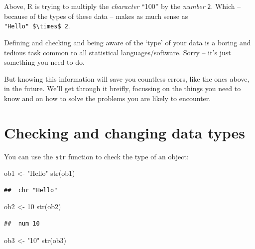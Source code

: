 \documentclass[
]{book}
\newenvironment{Shaded}{\begin{snugshade}}{\end{snugshade}}
\newcommand{\DecValTok}[1]{\textcolor[rgb]{0.00,0.00,0.81}{#1}}
\newcommand{\FunctionTok}[1]{\textcolor[rgb]{0.00,0.00,0.00}{#1}}
\newcommand{\NormalTok}[1]{#1}
\newcommand{\OtherTok}[1]{\textcolor[rgb]{0.56,0.35,0.01}{#1}}
\newcommand{\StringTok}[1]{\textcolor[rgb]{0.31,0.60,0.02}{#1}}
\begin{document}
Above, R is trying to multiply the \emph{character} ``100'' by the \emph{number} \texttt{2}. Which -- because of the types of these data -- makes as much sense as \texttt{"Hello"\ \$\textbackslash{}times\$\ 2}.

Defining and checking and being aware of the `type' of your data is a boring and tedious task common to all statistical languages/software.
Sorry -- it's just something you need to do.

But knowing this information will save you countless errors, like the ones above, in the future.
We'll get through it breifly, focussing on the things you need to know and on how to solve the problems you are likely to encounter.

\hypertarget{checking-and-changing-data-types}{%
\section{Checking and changing data types}\label{checking-and-changing-data-types}}

You can use the \texttt{str} function to check the type of an object:

\begin{Shaded}
\begin{Highlighting}[]
\NormalTok{ob1 }\OtherTok{\textless{}{-}} \StringTok{"Hello"}
\FunctionTok{str}\NormalTok{(ob1)}
\end{Highlighting}
\end{Shaded}

\begin{verbatim}
##  chr "Hello"
\end{verbatim}

\begin{Shaded}
\begin{Highlighting}[]
\NormalTok{ob2 }\OtherTok{\textless{}{-}} \DecValTok{10}
\FunctionTok{str}\NormalTok{(ob2)}
\end{Highlighting}
\end{Shaded}

\begin{verbatim}
##  num 10
\end{verbatim}

\begin{Shaded}
\begin{Highlighting}[]
\NormalTok{ob3 }\OtherTok{\textless{}{-}} \StringTok{"10"}
\FunctionTok{str}\NormalTok{(ob3)}
\end{Highlighting}
\end{Shaded}
\end{document}

